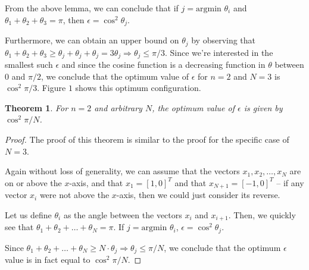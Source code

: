 \documentclass[11pt,letterpaper,twoside,english]{article}
\theoremstyle{theorem}
\newtheorem{theorem}{Theorem}[section]
\theoremstyle{remark}
\begin{document}
From the above lemma, we can conclude that if $j = \text{argmin } \theta_i$ and $\theta_1 + \theta_2 + \theta_3 = \pi$, then $\epsilon = \cos^2 \theta_j$.

Furthermore, we can obtain an upper bound on $\theta_j$ by observing that $\theta_ 1 + \theta_ 2 + \theta_3 \geq \theta_ j + \theta_j + \theta_j = 3 \theta_j \Rightarrow \theta_j \leq \pi/3$. Since we're interested in the smallest such $\epsilon$ and since the cosine function is a decreasing function in $\theta$ between $0$ and $\pi/2$, we conclude that the optimum value of $\epsilon$ for $n=2$ and $N=3$ is $\cos^2 \pi / 3$. Figure $1$ shows this optimum configuration.

\begin{theorem}
For $n=2$ and arbitrary $N$, the optimum value of $\epsilon$ is given by $\cos^2 \pi/N$.
\end{theorem}

\begin{proof}
The proof of this theorem is similar to the proof for the specific case of $N=3$.

Again without loss of generality, we can assume that the vectors $x_1, x_2, \ldots, x_N$ are on or above the $x$-axis, and that $x_1 = [1,0]^T$ and that $x_{N+1} = [-1,0]^T$ -- if any vector $x_i$ were not above the $x$-axis, then we could just consider its reverse.

Let us define $\theta_i$ as the angle between the vectors $x_i$ and $x_{i+1}$. Then, we quickly see that $\theta_1 + \theta_2 + \ldots + \theta_N = \pi$. If $j = \text{argmin } \theta_i$, $\epsilon = \cos^2 \theta_j$.

Since $\theta_ 1 + \theta_2 + \ldots + \theta_N \geq N \cdot \theta_j \Rightarrow \theta_j \leq \pi/N$, we conclude that the optimum $\epsilon$ value is in fact equal to $\cos^2 \pi/N$.
\end{proof}
\end{document}
